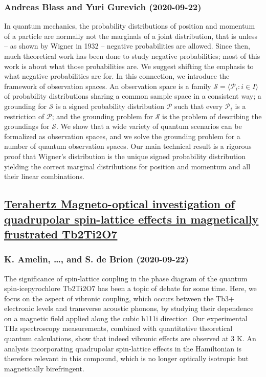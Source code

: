 {\subsubsection*{Andreas Blass and Yuri Gurevich (2020-09-22)}
In quantum mechanics, the probability distributions of position and momentum
of a particle are normally not the marginals of a joint distribution, that is
unless -- as shown by Wigner in 1932 -- negative probabilities are allowed.
Since then, much theoretical work has been done to study negative
probabilities; most of this work is about what those probabilities are. We
suggest shifting the emphasis to what negative probabilities are for. In this
connection, we introduce the framework of observation spaces. An observation
space is a family $\mathcal S = \big\langle\mathcal P_i: i\in I\big\rangle$ of
probability distributions sharing a common sample space in a consistent way; a
grounding for $\mathcal S$ is a signed probability distribution $\mathcal P$
such that every $\mathcal P_i$ is a restriction of $\mathcal P$; and the
grounding problem for $\mathcal S$ is the problem of describing the groundings
for $\mathcal S$. We show that a wide variety of quantum scenarios can be
formalized as observation spaces, and we solve the grounding problem for a
number of quantum observation spaces. Our main technical result is a rigorous
proof that Wigner's distribution is the unique signed probability distribution
yielding the correct marginal distributions for position and momentum and all
their linear combinations.

\subsection*{\href{http://arxiv.org/abs/2009.10545v1}{Terahertz Magneto-optical investigation of quadrupolar spin-lattice  effects in magnetically frustrated Tb2Ti2O7}}
\subsubsection*{K. Amelin, \dots, and S. de Brion (2020-09-22)}
The significance of spin-lattice coupling in the phase diagram of the quantum
spin-icepyrochlore Tb2Ti2O7 has been a topic of debate for some time. Here, we
focus on the aspect of vibronic coupling, which occurs between the Tb3+
electronic levels and transverse acoustic phonons, by studying their dependence
on a magnetic field applied along the cubic h111i direction. Our experimental
THz spectroscopy measurements, combined with quantitative theoretical quantum
calculations, show that indeed vibronic effects are observed at 3 K. An
analysis incorporating quadrupolar spin-lattice effects in the Hamiltonian is
therefore relevant in this compound, which is no longer optically isotropic but
magnetically birefringent.

}
